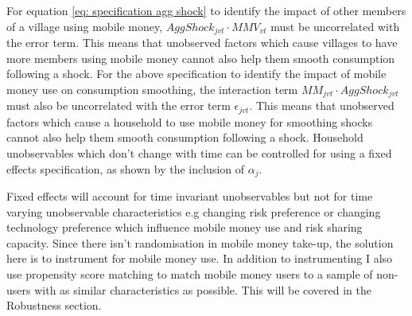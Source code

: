 For equation \eqref{eq: specification agg shock} to identify the impact of other members of a village using mobile money, $ AggShock_{jvt} \cdot MMV_{vt}$ must be uncorrelated with the error term. This means that unobserved factors which cause villages to have more members using mobile money cannot also help them smooth consumption following a shock. For the above specification to identify the impact of mobile money use on consumption smoothing, the interaction term $ MM_{jvt} \cdot AggShock_{jvt}$ must also be uncorrelated with the error term $\epsilon_{jvt}$. This means that unobserved factors which cause a household to use mobile money for smoothing shocks cannot also help them smooth consumption following a shock.  Household unobservables which don't change with time can be controlled for using a fixed effects specification, as shown by the inclusion of $\alpha_j$.

Fixed effects will account for time invariant unobservables but not for time varying unobservable characteristics e.g changing risk preference or changing technology preference which influence mobile money use and risk sharing capacity. Since there isn't  randomisation in mobile money take-up, the solution here is to instrument for mobile money use. In addition to instrumenting I also use propensity score matching to match mobile money users to a sample of non-users with as similar characteristics as possible. This will be covered in the Robustness section. 
